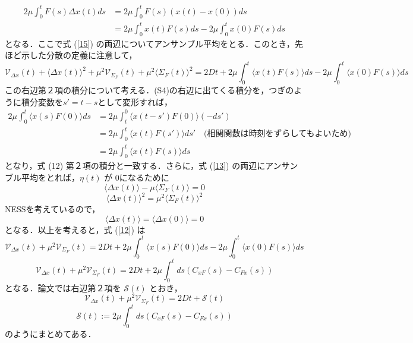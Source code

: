 \documentclass{jsarticle}
\numberwithin{equation}{section}
\theoremstyle{definition}
\begin{document}
\begin{align}
  2\mu \int_0^t F(s) \Delta x(t) ds &= 2\mu \int_0^t F(s) (x(t) - x(0)) ds \\
  &=2\mu \int_0^t x(t)F(s) ds - 2\mu \int_0^t x(0) F(s) ds 
\end{align}
となる．ここで式 (\ref{15}) の両辺についてアンサンブル平均をとる．このとき，先ほど示した分散の定義に注意して，
\begin{equation}
  \label{12}
  \mathcal{V} _{\Delta x} (t) + \langle \Delta x(t) \rangle^2 + \mu^2 \mathcal{V} _{\Sigma_F} (t) + \mu^2 \langle \Sigma_F (t) \rangle^2 = 2Dt + 2\mu \int_0^t \langle x(t)F(s) \rangle  ds - 2\mu \int_0^t \langle x(0) F(s) \rangle ds
\end{equation}
この右辺第２項の積分について考える．(S4)の右辺に出てくる積分を，つぎのように積分変数を$s' = t - s$として変形すれば，
\begin{align}
  2\mu \int_0^t \langle x(s)F(0) \rangle  ds &= 2\mu \int_t^0 \langle x(t - s')F(0) \rangle  (-ds') \\
  &= 2\mu \int_0^t \langle x(t)F(s') \rangle ds' \quad \text{(相関関数は時刻をずらしてもよいため)} \\
  &= 2\mu \int_0^t \langle x(t)F(s) \rangle ds
\end{align}
となり，式 (12) 第２項の積分と一致する．さらに，式 (\ref{13}) の両辺にアンサンブル平均をとれば，$\eta(t)$ が $0$になるために
\begin{equation}
  \langle \Delta x(t) \rangle - \mu \langle \Sigma_F (t) \rangle = 0
\end{equation}
\begin{equation}
  \langle \Delta x(t) \rangle^2 = \mu^2 \langle \Sigma_F (t) \rangle^2
\end{equation}
NESSを考えているので，
\begin{equation}
  \langle \Delta x(t) \rangle = \langle \Delta x(0) \rangle = 0
\end{equation}
となる．以上を考えると，式 (\ref{12}) は
\begin{equation}
  \mathcal{V} _{\Delta x} (t) + \mu^2 \mathcal{V} _{\Sigma_F} (t) = 2Dt + 2\mu \int_0^t \langle x(s)F(0) \rangle  ds - 2\mu \int_0^t \langle x(0) F(s) \rangle ds
\end{equation}
\begin{equation}
  \label{120}
  \mathcal{V} _{\Delta x} (t) + \mu^2 \mathcal{V} _{\Sigma_F} (t) = 2Dt + 2\mu \int_0^t ds ( C_{xF} (s) - C_{Fx} (s) )
\end{equation}
となる．論文では右辺第２項を $\mathcal{S} (t)$ とおき，
\begin{equation}
  \label{1}
  \mathcal{V} _{\Delta x} (t) + \mu^2 \mathcal{V} _{\Sigma_F} (t) = 2Dt + \mathcal{S} (t)
\end{equation}
\begin{equation}
  \mathcal{S} (t) := 2\mu \int_0^t ds ( C_{xF} (s) - C_{Fx} (s) )
\end{equation}
のようにまとめてある．
\end{document}
